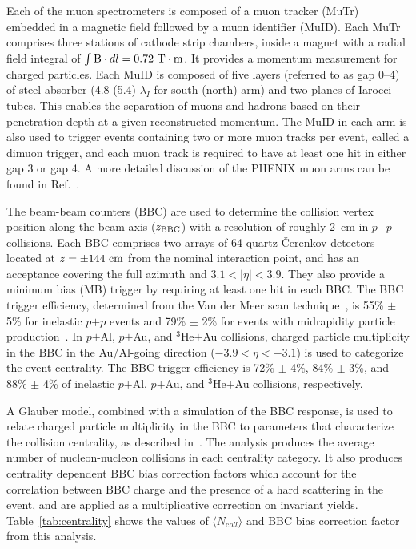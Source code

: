 \documentclass[twocolumn,letterpaper,aps,prc,longbibliography,superscriptaddress,nofootinbib,floatfix]{revtex4-1}
\newcommand{\meanncoll}{\mbox{$\langle N_{\mathrm coll} \rangle$}\xspace}
\newcommand{\pp}{\mbox{$p$$+$$p$}\xspace}
\newcommand{\pau}{\mbox{$p$$+$Au}\xspace}
\newcommand{\pal}{\mbox{$p$$+$Al}\xspace}
\newcommand{\heau}{\mbox{$^{3}$He$+$Au}\xspace}
\begin{document}
Each of the muon spectrometers is composed of a muon tracker (MuTr) 
embedded in a magnetic field followed by a muon identifier (MuID). Each 
MuTr comprises three stations of cathode strip chambers, inside a 
magnet with a radial field integral of $\int{{\rm B}\cdot dl}=0.72~{\rm 
T}\cdot{\rm m}$.  It provides a momentum measurement for charged 
particles. Each MuID is composed of five layers (referred to as gap 
0--4) of steel absorber (4.8 (5.4) $\lambda_{I}$ for south (north) arm) 
and two planes of Iarocci tubes.  This enables the separation of muons 
and hadrons based on their penetration depth at a given reconstructed 
momentum. The MuID in each arm is also used to trigger events containing 
two or more muon tracks per event, called a dimuon trigger, and each 
muon track is required to have at least one hit in either gap 3 or gap 
4. A more detailed discussion of the PHENIX muon arms can be found in 
Ref.~\cite{Akikawa:2003zs,Adachi:2013qha}.

The beam-beam counters (BBC) are used to determine the collision vertex 
position along the beam axis ($z_{\rm BBC}$) with a resolution of 
roughly 2~cm in \pp collisions. Each BBC comprises two arrays of 64 
quartz \v{C}erenkov detectors located at $z=\pm144~{\rm cm}$ from the 
nominal interaction point, and has an acceptance covering the full 
azimuth and $3.1<|\eta|<3.9$. They also provide a minimum bias (MB) 
trigger by requiring at least one hit in each BBC. The BBC trigger 
efficiency, determined from the Van der Meer scan 
technique~\cite{Drees:2003zza}, is 55\% $\pm$5\% for inelastic \pp 
events and 79\% $\pm$ 2\% for events with midrapidity particle 
production~\cite{Adler:2003pb,Adare:2013nff}. In \pal, \pau, and \heau 
collisions, charged particle multiplicity in the BBC in the Au/Al-going 
direction ($-3.9<\eta<-3.1$) is used to categorize the event centrality. 
The BBC trigger efficiency is 72\% $\pm$ 4\%, 84\% $\pm$ 3\%, and 88\% 
$\pm$ 4\% of inelastic \pal, \pau, and \heau collisions, respectively.

A Glauber model, combined with a simulation of the BBC response, is used 
to relate charged particle multiplicity in the BBC to parameters that 
characterize the collision centrality, as described 
in~\cite{Adare:2013nff}. The analysis produces the average number of 
nucleon-nucleon collisions in each centrality category. It also produces 
centrality dependent BBC bias correction factors which account for the 
correlation between BBC charge and the presence of a hard scattering in 
the event, and are applied as a multiplicative correction on invariant 
yields. Table~\ref{tab:centrality} shows the values of \meanncoll and 
BBC bias correction factor from this analysis.
\end{document}
